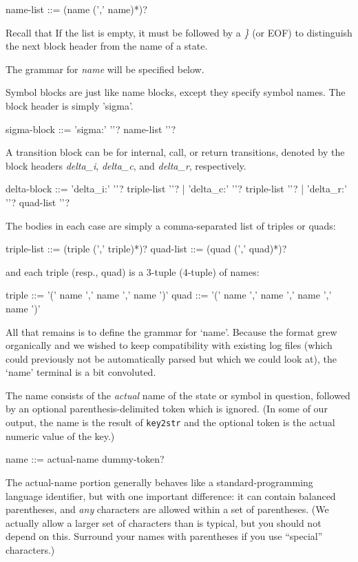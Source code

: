   name-list ::=  (name (','  name)*)?

Recall that If the list is empty, it must be followed by a \textsl{\}}
(or EOF) to distinguish the next block header from the name of a
state.

The grammar for \textsl{name} will be specified below.


Symbol blocks are just like name blocks, except they specify symbol
names. The block header is simply 'sigma'.

  sigma-block  ::=  'sigma:'  '{'?  name-list  '}'?


A transition block can be for internal, call, or return transitions,
denoted by the block headers \textsl{delta\_i}, \textsl{delta\_c}, and
\textsl{delta\_r}, respectively.
 
  delta-block  ::=  'delta\_i:'  '{'?  triple-list  '}'?
                 |  'delta\_c:'  '{'?  triple-list  '}'?
                 |  'delta\_r:'  '{'?  quad-list    '}'?

The bodies in each case are simply a comma-separated list of triples
or quads:

  triple-list ::=  (triple  (','  triple)*)?
  quad-list   ::=  (quad  (','  quad)*)?

and each triple (resp., quad) is a 3-tuple (4-tuple) of names:

  triple  ::=  '('  name ','  name  ','  name  ')'
  quad  ::=  '('  name ','  name  ','  name  ','  name  ')'


All that remains is to define the grammar for `name'. Because the
format grew organically and we wished to keep compatibility with
existing log files (which could previously not be automatically parsed
but which we could look at), the `name' terminal is a bit convoluted.

The name consists of the \textsl{actual} name of the state or symbol
in question, followed by an optional parenthesis-delimited token which
is ignored. (In some of our output, the name is the result of
\texttt{key2str} and the optional token is the actual numeric value of
the key.)

  name  ::=  actual-name  dummy-token?

The actual-name portion generally behaves like a standard-programming
language identifier, but with one important difference: it can contain
balanced parentheses, and \textsl{any} characters are allowed within a
set of parentheses. (We actually allow a larger set of characters than
is typical, but you should not depend on this. Surround your names
with parentheses if you use ``special'' characters.)

